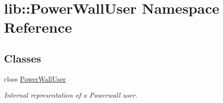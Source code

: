 \hypertarget{namespacelib_1_1PowerWallUser}{\section{lib\-:\-:\-Power\-Wall\-User \-Namespace \-Reference}
\label{namespacelib_1_1PowerWallUser}
}
\subsection*{\-Classes}
\begin{DoxyCompactItemize}
\item 
class \hyperlink{classlib_1_1PowerWallUser_1_1PowerWallUser}{\-Power\-Wall\-User}
\begin{DoxyCompactList}\small\item\em \-Internal representation of a \-Powerwall user. \end{DoxyCompactList}\end{DoxyCompactItemize}
